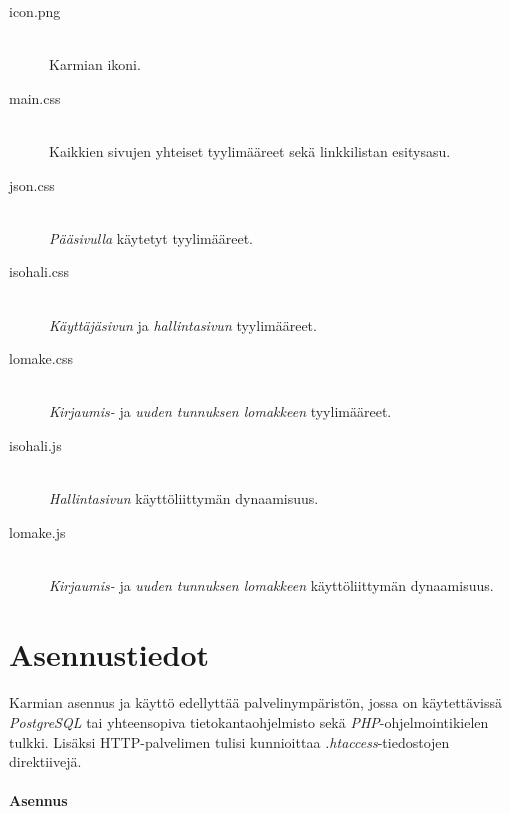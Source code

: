 \documentclass[11pt]{article}
\begin{document}
\begin{description}
\item[icon.png] \hfill \\
Karmian ikoni.
\item[main.css] \hfill \\
Kaikkien sivujen yhteiset tyylimääreet sekä linkkilistan esitysasu.
\item[json.css] \hfill \\
\emph{Pääsivulla} käytetyt tyylimääreet.
\item[isohali.css] \hfill \\
\emph{Käyttäjäsivun} ja \emph{hallintasivun} tyylimääreet.
\item[lomake.css] \hfill \\
\emph{Kirjaumis-} ja \emph{uuden tunnuksen lomakkeen} tyylimääreet.
\item[isohali.js] \hfill \\
\emph{Hallintasivun} käyttöliittymän dynaamisuus.
\item[lomake.js] \hfill \\
\emph{Kirjaumis-} ja \emph{uuden tunnuksen lomakkeen} käyttöliittymän dynaamisuus.
\end{description}


\section{Asennustiedot}

\paragraph{} Karmian asennus ja käyttö edellyttää palvelinympäristön, jossa on käytettävissä \emph{PostgreSQL} tai yhteensopiva tietokantaohjelmisto sekä \emph{PHP}-ohjelmointikielen tulkki. Lisäksi HTTP-palvelimen tulisi kunnioittaa \emph{.htaccess}-tiedostojen direktiivejä.

\paragraph{Asennus}
\end{document}
